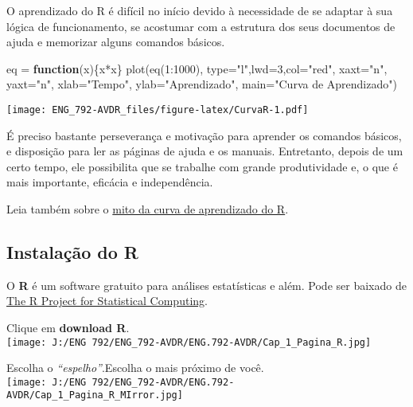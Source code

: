 \documentclass[
]{book}
\newenvironment{Shaded}{\begin{snugshade}}{\end{snugshade}}
\newcommand{\AttributeTok}[1]{\textcolor[rgb]{0.77,0.63,0.00}{#1}}
\newcommand{\ControlFlowTok}[1]{\textcolor[rgb]{0.13,0.29,0.53}{\textbf{#1}}}
\newcommand{\DecValTok}[1]{\textcolor[rgb]{0.00,0.00,0.81}{#1}}
\newcommand{\FunctionTok}[1]{\textcolor[rgb]{0.00,0.00,0.00}{#1}}
\newcommand{\NormalTok}[1]{#1}
\newcommand{\OtherTok}[1]{\textcolor[rgb]{0.56,0.35,0.01}{#1}}
\newcommand{\SpecialCharTok}[1]{\textcolor[rgb]{0.00,0.00,0.00}{#1}}
\newcommand{\StringTok}[1]{\textcolor[rgb]{0.31,0.60,0.02}{#1}}
\begin{document}
O aprendizado do R é difícil no início devido à necessidade de se adaptar à sua lógica de funcionamento, se acostumar com a estrutura dos seus documentos de ajuda e memorizar alguns comandos básicos.

\begin{Shaded}
\begin{Highlighting}[]
\NormalTok{eq }\OtherTok{=} \ControlFlowTok{function}\NormalTok{(x)\{x}\SpecialCharTok{*}\NormalTok{x\}}
\FunctionTok{plot}\NormalTok{(}\FunctionTok{eq}\NormalTok{(}\DecValTok{1}\SpecialCharTok{:}\DecValTok{1000}\NormalTok{), }\AttributeTok{type=}\StringTok{"l"}\NormalTok{,}\AttributeTok{lwd=}\DecValTok{3}\NormalTok{,}\AttributeTok{col=}\StringTok{"red"}\NormalTok{, }\AttributeTok{xaxt=}\StringTok{"n"}\NormalTok{, }\AttributeTok{yaxt=}\StringTok{"n"}\NormalTok{, }\AttributeTok{xlab=}\StringTok{"Tempo"}\NormalTok{, }\AttributeTok{ylab=}\StringTok{"Aprendizado"}\NormalTok{, }\AttributeTok{main=}\StringTok{"Curva de Aprendizado"}\NormalTok{)}
\end{Highlighting}
\end{Shaded}

\texttt{[image: ENG\_792-AVDR\_files/figure-latex/CurvaR-1.pdf]}

É preciso bastante perseverança e motivação para aprender os comandos básicos, e disposição para ler as páginas de ajuda e os manuais.
Entretanto, depois de um certo tempo, ele possibilita que se trabalhe com grande produtividade e, o que é mais importante, eficácia e independência.

Leia também sobre o \href{https://www.r-bloggers.com/2021/07/the-myth-of-the-r-learning-curve/}{mito da curva de aprendizado do R}.

\hypertarget{instalauxe7uxe3o-do-r}{%
\subsection{Instalação do R}\label{instalauxe7uxe3o-do-r}}

O \textbf{R} é um software gratuito para análises estatísticas e além. Pode ser baixado de \href{https://www.r-project.org/}{The R Project for Statistical Computing}.

Clique em \textbf{download R}.\\
\texttt{[image: J:/ENG 792/ENG\_792-AVDR/ENG.792-AVDR/Cap\_1\_Pagina\_R.jpg]}

Escolha o \emph{``espelho''}.Escolha o mais próximo de você.\\
\texttt{[image: J:/ENG 792/ENG\_792-AVDR/ENG.792-AVDR/Cap\_1\_Pagina\_R\_MIrror.jpg]}
\end{document}
